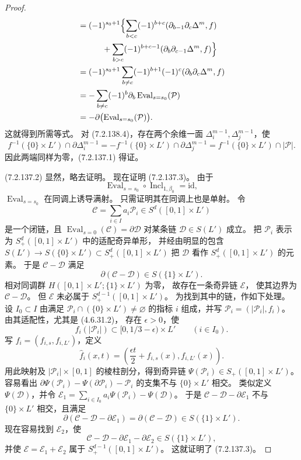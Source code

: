 \begin{proof}
\[\begin{aligned}
&=(-1)^{s_0+1}
\Bigl\{\sum_{b<c}(-1)^{b+c}
(\partial_{b-1}\partial_c\Delta^m,f)\\
&\hspace{3em}+\sum_{b>c}(-1)^{b+c-1}
(\partial_b\partial_{c-1}\Delta^m,f)\Bigr\}\\
&=(-1)^{s_0+1}
\sum_{b\ne c}(-1)^{b+1}(-1)^c
(\partial_b\partial_c\Delta^m,f)\\
&=-\sum_{b\ne c}(-1)^b
\partial_b\operatorname{Eval}_{s=s_0}(\mathcal P)\\
&=-\partial\bigl(
\operatorname{Eval}_{s=s_0}(\mathcal P)\bigr).
\end{aligned}
\]
这就得到所需等式。
对 (7.2.138.4)，存在两个余维一面
$\Delta_i^{m-1},\Delta_j^{m-1}$，使
\[
f^{-1}(\{0\}\times L')\cap\partial\Delta_i^{m-1}
=-f^{-1}(\{0\}\times L')\cap\partial\Delta_j^{m-1}
=f^{-1}(\{0\}\times L')\cap|\mathcal P|.
\]
因此两端同样为零，(7.2.137.1) 得证。

(7.2.137.2) 显然，略去证明。
现在证明 (7.2.137.3)。
由于
\[
\operatorname{Eval}_{s=s_0}\circ
\operatorname{Incl}_{1,\beta_0}=\mathrm{id},
\]
$\operatorname{Eval}_{s=s_0}$ 在同调上诱导满射。
只需证明其在同调上也是单射。
令
\[
\mathcal C=\sum_{i\in I}a_i\mathcal P_i
\in S^d([0,1]\times L')
\]
是一个闭链，且
$\operatorname{Eval}_{s=0}(\mathcal C)=\partial\mathcal D$
对某条链 $\mathcal D\in S(L')$ 成立。
把 $\mathcal P_i$ 表示为
$S_+^d([0,1]\times L')$ 中的适配奇异单形，
并经由明显的包含
$S(L')\to S(\{0\}\times L')
\subset S_+^d([0,1]\times L')$
把 $\mathcal D$ 看作 $S_+^d([0,1]\times L')$ 的元素。
于是 $\mathcal C-\mathcal D$ 满足
\[
\partial(\mathcal C-\mathcal D)
\in S(\{1\}\times L').
\]
相对同调群
$H([0,1]\times L';\{1\}\times L')$ 为零，
故存在一条奇异链 $\mathcal E$，
使其边界为 $\mathcal C-\mathcal D$。
但 $\mathcal E$ 未必属于
$S_+^{d-1}([0,1]\times L')$。
为找到其中的链，作如下处理。
设 $I_0\subset I$ 由满足
$\mathcal P_i\cap(\{0\}\times L')\ne\varnothing$
的指标 $i$ 组成，并写
$\mathcal P_i=(|\mathcal P_i|,f_i)$。
由其适配性，尤其是 (4.6.31.2)，
存在 $\epsilon>0$，使
\[
f_i(|\mathcal P_i|)
\subset[0,1/3-\epsilon)\times L'
\qquad(i\in I_0).
\]
写 $f_i=(f_{i,s},f_{i,L'})$，定义
\begin{equation}
\widehat f_i(x,t)=
\left(\frac{\epsilon t}{2}+f_{i,s}(x),
f_{i,L'}(x)\right).
\tag{7.2.139}\label{eq:7-2-139}
\end{equation}
用此映射及 $|\mathcal P_i|\times[0,1]$
的棱柱剖分，得到奇异链
$\Psi(\mathcal P_i)\in S_+([0,1]\times L')$。
容易看出
$\partial\Psi(\mathcal P_i)-
\Psi(\partial\mathcal P_i)-\mathcal P_i$
的支集不与 $\{0\}\times L'$ 相交。
类似定义 $\Psi(\mathcal D)$，并令
$\mathcal E_1=
\sum_{i\in I_0}a_i\Psi(\mathcal P_i)-
\Psi(\mathcal D)$。
于是 $\mathcal C-\mathcal D-\partial\mathcal E_1$
不与 $\{0\}\times L'$ 相交，且满足
\[
\partial(\mathcal C-\mathcal D-
\partial\mathcal E_1)
=\partial(\mathcal C-\mathcal D)
\in S(\{1\}\times L').
\]
现在容易找到 $\mathcal E_2$，使
\[
\mathcal C-\mathcal D-
\partial\mathcal E_1-
\partial\mathcal E_2
\in S(\{1\}\times L'),
\]
并使 $\mathcal E=\mathcal E_1+\mathcal E_2$
属于 $S_+^{d-1}([0,1]\times L')$。
这就证明了 (7.2.137.3)。
\end{proof}


